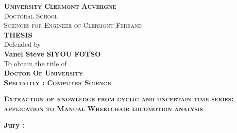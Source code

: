 \begin{titlepage}
\begin{center}
\large{ \textbf{ \textsc{University Clermont Auvergne} } }\\
\large{ \textsc{Doctoral School} }\\
\large{ \textsc{Sciences for Engineer of Clermont-Ferrand} }\\
\large{ \textbf{ \textsc{THESIS}}}\\
Defended by\\
\large{ \textbf{ Vanel Steve SIYOU FOTSO}}\\
To obtain the title of\\
\large{ \textbf{ \textsc{Doctor Of University}}}\\

\large{ \textbf{\textsc{ Speciality : Computer Science}}}\\

\end{center}
\hrulefill
\begin{center}\bfseries\Huge
    \textsc{Extraction of knowledge from cyclic and uncertain time series: application to Manual Wheelchair locomotion analysis}
\end{center}
\hrulefill
\vspace*{1cm}
    
\begin{center}%
\textbf{ Jury : }\\


\end{center}
\end{titlepage}
